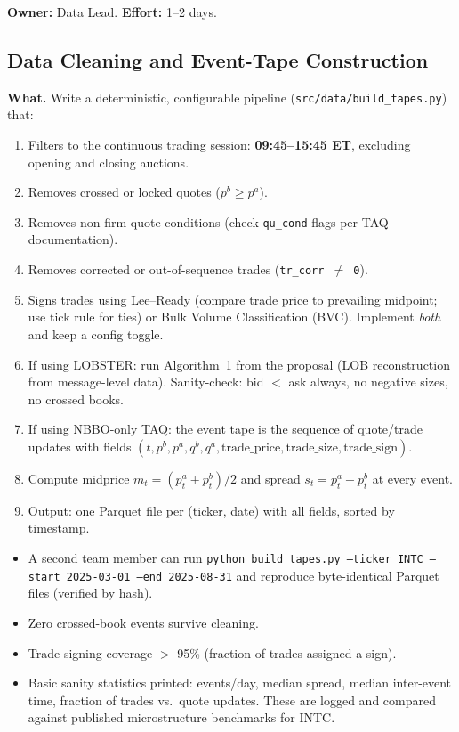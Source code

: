 \documentclass[11pt,a4paper]{article}
\begin{document}
\textbf{Owner:} Data Lead. \quad \textbf{Effort:} 1--2 days.

\subsection{Data Cleaning and Event-Tape Construction}

\textbf{What.}
Write a deterministic, configurable pipeline (\texttt{src/data/build\_tapes.py}) that:

\begin{enumerate}[nosep]
  \item Filters to the continuous trading session: \textbf{09:45--15:45 ET}, excluding opening and closing auctions.
  \item Removes crossed or locked quotes ($p^b \geq p^a$).
  \item Removes non-firm quote conditions (check \texttt{qu\_cond} flags per TAQ documentation).
  \item Removes corrected or out-of-sequence trades (\texttt{tr\_corr $\neq$ 0}).
  \item Signs trades using Lee--Ready (compare trade price to prevailing midpoint; use tick rule for ties) or Bulk Volume Classification (BVC).  Implement \textit{both} and keep a config toggle.
  \item If using LOBSTER: run Algorithm~1 from the proposal (LOB reconstruction from message-level data).  Sanity-check: bid $<$ ask always, no negative sizes, no crossed books.
  \item If using NBBO-only TAQ: the event tape is the sequence of quote/trade updates with fields $(t, p^b, p^a, q^b, q^a, \text{trade\_price}, \text{trade\_size}, \text{trade\_sign})$.
  \item Compute midprice $m_t = (p^a_t + p^b_t)/2$ and spread $s_t = p^a_t - p^b_t$ at every event.
  \item Output: one Parquet file per (ticker, date) with all fields, sorted by timestamp.
\end{enumerate}

\begin{successbox}
  \begin{itemize}[nosep]
    \item A second team member can run \texttt{python build\_tapes.py --ticker INTC --start 2025-03-01 --end 2025-08-31} and reproduce byte-identical Parquet files (verified by hash).
    \item Zero crossed-book events survive cleaning.
    \item Trade-signing coverage $>$ 95\% (fraction of trades assigned a sign).
    \item Basic sanity statistics printed: events/day, median spread, median inter-event time, fraction of trades vs.\ quote updates.  These are logged and compared against published microstructure benchmarks for INTC.
  \end{itemize}
\end{successbox}
\end{document}
